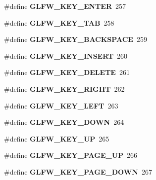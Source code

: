 \begin{DoxyCompactItemize}
\#define {\bfseries G\+L\+F\+W\+\_\+\+K\+E\+Y\+\_\+\+E\+N\+T\+ER}~257
\item 
\mbox{\label{group__keys_ga6908a4bda9950a3e2b73f794bbe985df}} 
\#define {\bfseries G\+L\+F\+W\+\_\+\+K\+E\+Y\+\_\+\+T\+AB}~258
\item 
\mbox{\label{group__keys_ga6c0df1fe2f156bbd5a98c66d76ff3635}} 
\#define {\bfseries G\+L\+F\+W\+\_\+\+K\+E\+Y\+\_\+\+B\+A\+C\+K\+S\+P\+A\+CE}~259
\item 
\mbox{\label{group__keys_ga373ac7365435d6b0eb1068f470e34f47}} 
\#define {\bfseries G\+L\+F\+W\+\_\+\+K\+E\+Y\+\_\+\+I\+N\+S\+E\+RT}~260
\item 
\mbox{\label{group__keys_gadb111e4df74b8a715f2c05dad58d2682}} 
\#define {\bfseries G\+L\+F\+W\+\_\+\+K\+E\+Y\+\_\+\+D\+E\+L\+E\+TE}~261
\item 
\mbox{\label{group__keys_ga06ba07662e8c291a4a84535379ffc7ac}} 
\#define {\bfseries G\+L\+F\+W\+\_\+\+K\+E\+Y\+\_\+\+R\+I\+G\+HT}~262
\item 
\mbox{\label{group__keys_gae12a010d33c309a67ab9460c51eb2462}} 
\#define {\bfseries G\+L\+F\+W\+\_\+\+K\+E\+Y\+\_\+\+L\+E\+FT}~263
\item 
\mbox{\label{group__keys_gae2e3958c71595607416aa7bf082be2f9}} 
\#define {\bfseries G\+L\+F\+W\+\_\+\+K\+E\+Y\+\_\+\+D\+O\+WN}~264
\item 
\mbox{\label{group__keys_ga2f3342b194020d3544c67e3506b6f144}} 
\#define {\bfseries G\+L\+F\+W\+\_\+\+K\+E\+Y\+\_\+\+UP}~265
\item 
\mbox{\label{group__keys_ga3ab731f9622f0db280178a5f3cc6d586}} 
\#define {\bfseries G\+L\+F\+W\+\_\+\+K\+E\+Y\+\_\+\+P\+A\+G\+E\+\_\+\+UP}~266
\item 
\mbox{\label{group__keys_gaee0a8fa442001cc2147812f84b59041c}} 
\#define {\bfseries G\+L\+F\+W\+\_\+\+K\+E\+Y\+\_\+\+P\+A\+G\+E\+\_\+\+D\+O\+WN}~267
\item 
\mbox{\label{group__keys_ga41452c7287195d481e43207318c126a7}} 

\end{DoxyCompactItemize}
